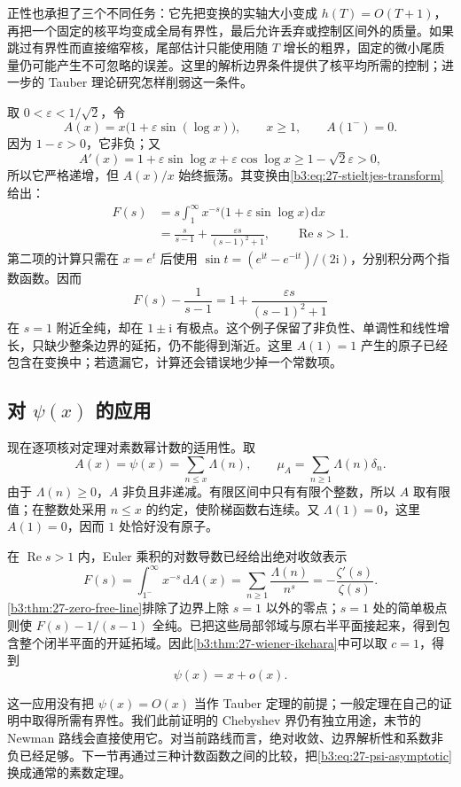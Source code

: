 \ProseParagraphBreak

正性也承担了三个不同任务：它先把变换的实轴大小变成 \(h(T)=O(T+1)\)，再把一个固定的核平均变成全局有界性，最后允许丢弃或控制区间外的质量。如果跳过有界性而直接缩窄核，尾部估计只能使用随 \(T\) 增长的粗界，固定的微小尾质量仍可能产生不可忽略的误差。这里的解析边界条件提供了核平均所需的控制；进一步的 Tauber 理论研究怎样削弱这一条件。

\begin{remark}[仅有一个边界点的信息不足]
\label{b3:rem:27-one-boundary-point}
取 \(0<\varepsilon<1/\sqrt2\)，令
\[
 A(x)=x\bigl(1+\varepsilon\sin(\log x)\bigr),\qquad x\ge1,
 \qquad A(1^-)=0.
\]
因为 \(1-\varepsilon>0\)，它非负；又
\[
 A'(x)=1+\varepsilon\sin\log x+\varepsilon\cos\log x
 \ge1-\sqrt2\varepsilon>0,
\]
所以它严格递增，但 \(A(x)/x\) 始终振荡。其变换由\eqref{b3:eq:27-stieltjes-transform}给出：
\[
 \begin{aligned}
 F(s)
 &=s\int_1^\infty x^{-s}\bigl(1+\varepsilon\sin\log x\bigr)\,\mathrm dx\\
 &=\frac{s}{s-1}+\frac{\varepsilon s}{(s-1)^2+1},
 \qquad\operatorname{Re}s>1.
 \end{aligned}
\]
第二项的计算只需在 \(x=e^t\) 后使用
\(\sin t=(e^{\mathrm it}-e^{-\mathrm it})/(2\mathrm i)\)，分别积分两个指数函数。因而
\[
 F(s)-\frac1{s-1}
 =1+\frac{\varepsilon s}{(s-1)^2+1}
\]
在 \(s=1\) 附近全纯，却在 \(1\pm\mathrm i\) 有极点。这个例子保留了非负性、单调性和线性增长，只缺少整条边界的延拓，仍不能得到渐近。这里 \(A(1)=1\) 产生的原子已经包含在变换中；若遗漏它，计算还会错误地少掉一个常数项。
\end{remark}

\subsection{对 \texorpdfstring{\(\psi(x)\)}{\AnalysisPdfPsi(x)} 的应用}
\label{b3:subsec:270403}

现在逐项核对定理对素数幂计数的适用性。取
\[
 A(x)=\psi(x)=\sum_{n\le x}\Lambda(n),
 \qquad \mu_A=\sum_{n\ge1}\Lambda(n)\delta_n.
\]
由于 \(\Lambda(n)\ge0\)，\(A\) 非负且非递减。有限区间中只有有限个整数，所以 \(A\) 取有限值；在整数处采用 \(n\le x\) 的约定，使阶梯函数右连续。又 \(\Lambda(1)=0\)，这里 \(A(1)=0\)，因而 \(1\) 处恰好没有原子。

\ProseParagraphBreak

在 \(\operatorname{Re}s>1\) 内，Euler 乘积的对数导数已经给出绝对收敛表示
\[
 F(s)=\int_{1^-}^\infty x^{-s}\,\mathrm dA(x)
 =\sum_{n\ge1}\frac{\Lambda(n)}{n^s}
 =-\frac{\zeta'(s)}{\zeta(s)}.
\]
\cref{b3:thm:27-zero-free-line}排除了边界上除 \(s=1\) 以外的零点；\(s=1\) 处的简单极点则使 \(F(s)-1/(s-1)\) 全纯。已把这些局部邻域与原右半平面接起来，得到包含整个闭半平面的开延拓域。因此\cref{b3:thm:27-wiener-ikehara}中可以取 \(c=1\)，得到
\begin{equation}
\label{b3:eq:27-psi-asymptotic}
 \psi(x)=x+o(x).
\end{equation}

这一应用没有把 \(\psi(x)=O(x)\) 当作 Tauber 定理的前提；一般定理在自己的证明中取得所需有界性。我们此前证明的 Chebyshev 界仍有独立用途，末节的 Newman 路线会直接使用它。对当前路线而言，绝对收敛、边界解析性和系数非负已经足够。下一节再通过三种计数函数之间的比较，把\eqref{b3:eq:27-psi-asymptotic}换成通常的素数定理。
